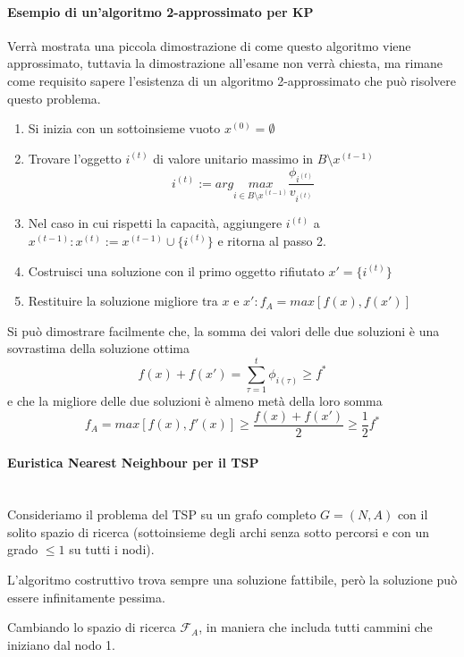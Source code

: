 \documentclass{article}
\begin{document}
\paragraph{Esempio di un'algoritmo 2-approssimato per KP}\mbox{}
Verrà mostrata una piccola dimostrazione di come questo algoritmo viene approssimato, tuttavia la dimostrazione
all'esame non verrà chiesta, ma rimane come requisito sapere l'esistenza di un algoritmo 2-approssimato che può
risolvere questo problema.

\begin{enumerate}
    \item Si inizia con un sottoinsieme vuoto $x^{(0)}=\emptyset$
    \item Trovare l'oggetto $i^{(t)}$ di valore unitario massimo in $B\setminus x^{(t-1)}$
          $$i^{(t)}:=arg\underset{i\in B\setminus x^{(t-1)}}{max}\frac{\phi_{i^{(t)}}}{v_{i^{(t)}}}$$
    \item Nel caso in cui rispetti la capacità, aggiungere $i^{(t)}$ a $x^{(t-1)}:x^{(t)}:=x^{(t-1)}\cup\{i^{(t)}\}$
          e ritorna al passo 2.
    \item Costruisci una soluzione con il primo oggetto rifiutato $x'=\{i^{(t)}\}$
    \item Restituire la soluzione migliore tra $x$ e $x':f_A=max[f(x),f(x')]$

\end{enumerate}

Si può dimostrare facilmente che, la somma dei valori delle due soluzioni è una sovrastima
della soluzione ottima
$$f(x)+f(x')=\sum_{\tau =1}^t \phi_{i(\tau)}\geq f^*$$
e che la migliore delle due soluzioni è almeno metà della loro somma
$$f_A = max[f(x),f'(x)]\geq\frac{f(x)+f(x')}{2}\geq\frac{1}{2}f^*$$

\paragraph{Euristica Nearest Neighbour per il TSP}\mbox{}\\
Consideriamo il problema del TSP su un grafo completo $G=(N,A)$ con il solito spazio di ricerca
(sottoinsieme degli archi senza sotto percorsi e con un grado $\leq 1$ su tutti i nodi).

L'algoritmo costruttivo trova sempre una soluzione fattibile, però la soluzione può essere
infinitamente pessima.

Cambiando lo spazio di ricerca $\mathcal{F}_A$, in maniera che includa tutti cammini che iniziano
dal nodo 1.
\end{document}
